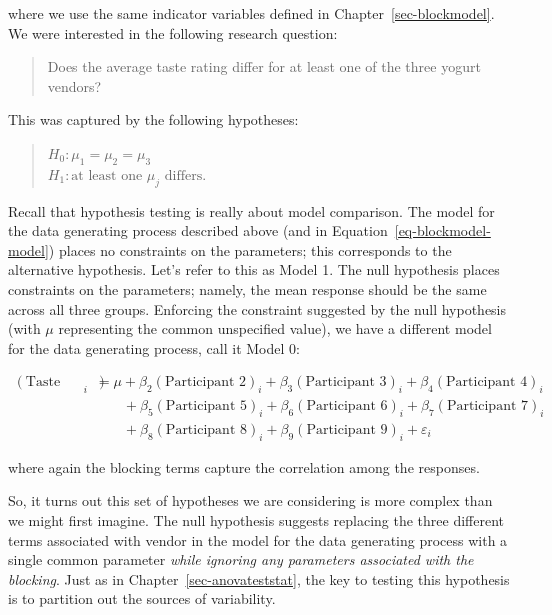 \documentclass[
  letterpaper,
  DIV=11,
  numbers=noendperiod]{scrreprt}
\theoremstyle{definition}
\theoremstyle{definition}
\theoremstyle{plain}
\theoremstyle{remark}
\begin{document}
where we use the same indicator variables defined in
Chapter~\ref{sec-blockmodel}. We were interested in the following
research question:

\begin{quote}
Does the average taste rating differ for at least one of the three
yogurt vendors?
\end{quote}

This was captured by the following hypotheses:

\begin{quote}
\(H_0: \mu_1 = \mu_2 = \mu_3\)\\
\(H_1: \text{at least one } \mu_j \text{ differs}.\)
\end{quote}

Recall that hypothesis testing is really about model comparison. The
model for the data generating process described above (and in
Equation~\ref{eq-blockmodel-model}) places no constraints on the
parameters; this corresponds to the alternative hypothesis. Let's refer
to this as Model 1. The null hypothesis places constraints on the
parameters; namely, the mean response should be the same across all
three groups. Enforcing the constraint suggested by the null hypothesis
(with \(\mu\) representing the common unspecified value), we have a
different model for the data generating process, call it Model 0:

\[
\begin{aligned}
  (\text{Taste Rating})_i &= \mu + \beta_2 (\text{Participant 2})_i + \beta_3 (\text{Participant 3})_i + \beta_4 (\text{Participant 4})_i \\
    &\qquad + \beta_5 (\text{Participant 5})_i + \beta_6 (\text{Participant 6})_i + \beta_7 (\text{Participant 7})_i \\
    &\qquad + \beta_8 (\text{Participant 8})_i + \beta_9 (\text{Participant 9})_i + \varepsilon_i
\end{aligned}
\]

where again the blocking terms capture the correlation among the
responses.

So, it turns out this set of hypotheses we are considering is more
complex than we might first imagine. The null hypothesis suggests
replacing the three different terms associated with vendor in the model
for the data generating process with a single common parameter
\emph{while ignoring any parameters associated with the blocking}. Just
as in Chapter~\ref{sec-anovateststat}, the key to testing this
hypothesis is to partition out the sources of variability.
\end{document}
